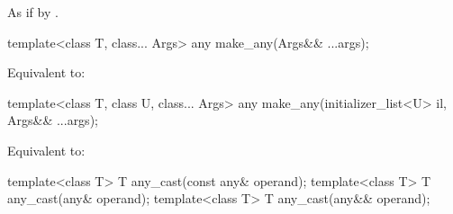 \begin{itemdescr}
\pnum
\effects
As if by .
\end{itemdescr}

%
\begin{itemdecl}
template<class T, class... Args>
  any make_any(Args&& ...args);
\end{itemdecl}

\begin{itemdescr}
\pnum
\effects
Equivalent to: 
\end{itemdescr}

%
\begin{itemdecl}
template<class T, class U, class... Args>
  any make_any(initializer_list<U> il, Args&& ...args);
\end{itemdecl}

\begin{itemdescr}
\pnum
\effects
Equivalent to: 
\end{itemdescr}

%
\begin{itemdecl}
template<class T>
  T any_cast(const any& operand);
template<class T>
  T any_cast(any& operand);
template<class T>
  T any_cast(any&& operand);
\end{itemdecl}

